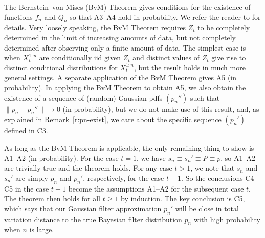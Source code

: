 The Bernstein--von Mises (BvM) Theorem gives conditions for the existence of functions $f_n$ and $Q_n$ so that A3--A4 hold in probability. We refer the reader to \textcite{vdV98} for details. Very loosely speaking, the BvM Theorem requires $Z_t$ to be completely determined in the limit of increasing amounts of data, but not completely determined after observing only a finite amount of data. The simplest case is when $X_t^{1:n}$ are conditionally iid given $Z_t$ and distinct values of $Z_t$ give rise to distinct conditional distributions for $X_t^{1:n}$, but the result holds in much more general settings. A separate application of the BvM Theorem gives A5 (in probability). In applying the BvM Theorem to obtain A5, we also obtain the existence of a sequence of (random) Gaussian pdfs $(p_n'')$ such that $\|p_n-p_n''\|\to 0$ (in probability), but we do not make use of this result, and, as explained in Remark~\ref{r:pn-exist}, we care about the specific sequence $(p_n')$ defined in C3.

As long as the BvM Theorem is applicable, the only remaining thing to show is A1--A2 (in probability). For the case $t=1$, we have $s_n\equiv s_n'\equiv P\equiv p$, so A1--A2 are trivially true and the theorem holds. For any case $t > 1$, we note that $s_n$ and $s_n'$ are simply $p_n$ and $p_n'$, respectively, for the case $t-1$. So the  conclusions C4--C5 in the case $t-1$ become the assumptions A1--A2 for the subsequent case $t$. The theorem then holds for all $t\geq 1$ by induction. The key conclusion is C5, which says that our Gaussian filter approximation $p_n'$ will be close in total variation distance to the true Bayesian filter distribution $p_n$ with high probability when $n$ is large.
  
\medskip

